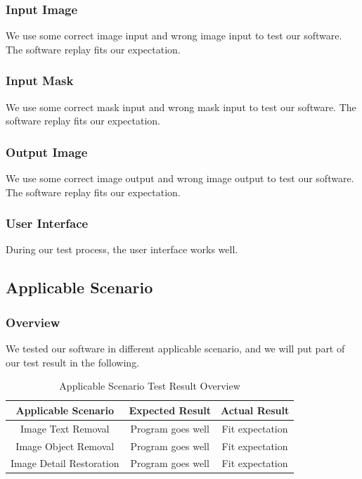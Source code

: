 \subsubsection*{Input Image}
\qquad We use some correct image input and wrong image input to test our software. The software replay fits our expectation. 
\subsubsection*{Input Mask}
\qquad We use some correct mask input and wrong mask input to test our software. The software replay fits our expectation. 
\subsubsection*{Output Image}
\qquad We use some correct image output and wrong image output to test our software. The software replay fits our expectation. 
\subsubsection*{User Interface} 
\qquad During our test process, the user interface works well.

\subsection{Applicable Scenario}
\subsubsection*{Overview}
\qquad We tested our software in different applicable scenario, and we will put part of our test result in the following.
\begin{table}[H]
	\centering
	\begin{tabular}{|c|c|c|}
		\hline
		Applicable Scenario & Expected Result& Actual Result\\
		\hline
		Image Text Removal & Program goes well& Fit expectation\\
		\hline
		Image Object Removal & Program goes well& Fit expectation\\
		\hline
		Image Detail Restoration  & Program goes well& Fit expectation\\
		\hline
	\end{tabular}
	\caption{Applicable Scenario Test Result Overview}
\end{table}

